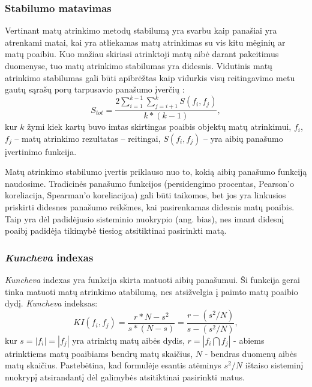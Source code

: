 \subsubsection{Stabilumo matavimas}

Vertinant matų atrinkimo metodų stabilumą yra svarbu kaip panašiai yra atrenkami matai, kai yra atliekamas matų atrinkimas su vis kitu mėginių ar matų poaibiu. Kuo mažiau skiriasi atrinktoji matų aibė darant pakeitimus duomenyse, tuo matų atrinkimo stabilumas yra didesnis. Vidutinis matų atrinkimo stabilumas gali būti apibrėžtas kaip vidurkis visų reitingavimo metu gautų sąrašų porų tarpusavio panašumo įverčių \cite{kalousis2007stability}:
\begin{equation}
 S_{tot}=\frac{2\sum_{i=1}^{k-1}\sum_{j=i+1}^{k} S(f_i, f_j)}{k*(k-1)},
\end{equation} 
kur $k$ žymi kiek kartų buvo imtas skirtingas poaibis objektų matų atrinkimui,
$f_i$, $f_j$ -- matų atrinkimo rezultatas -- reitingai, 
$S(f_i, f_j)$ -- yra aibių panašumo įvertinimo funkcija.

Matų atrinkimo stabilumo įvertis priklauso nuo to, kokią aibių panašumo funkciją naudosime. Tradicinės panašumo funkcijos (persidengimo procentas, Pearson'o koreliacija, Spearman'o koreliacijoa) gali būti taikomos, bet jos yra linkusios priskirti didesnes panašumo reikšmes, kai pasirenkamas didesnis matų poaibis. Taip yra dėl padidėjusio sisteminio nuokrypio (ang. bias), nes imant didesnį poaibį padidėja tikimybė tiesiog atsitiktinai pasirinkti matą.

\subsubsection{\textit{Kuncheva} indexas}

\textit{Kuncheva} indexas \cite{DBLP:conf/aia/Kuncheva07} yra funkcija skirta matuoti aibių panašumui. Ši funkcija gerai tinka matuoti matų atrinkimo atabilumą, nes atsižvelgia į paimto matų poaibio dydį. \textit{Kuncheva} indeksas:
\begin{equation}
\label{kuncheva_index}
 KI(f_i, f_j)=\frac{r*N - s^2}{s*(N-s)}=\frac{r - (s^2/N)}{s - (s^2/N)},
\end{equation}		
kur $s=|f_i|=|f_j|$ yra atrinktų matų aibės dydis, $r=|f_i \bigcap f_j|$ - abiems atrinktiems matų poaibiams bendrų matų skaičius, $N$ - bendras  duomenų aibės matų skaičius. Pastebėtina, kad formulėje esantis atėminys $s^2/N$ ištaiso sisteminį nuokrypį atsirandantį dėl galimybės atsitiktinai pasirinkti matus. 

